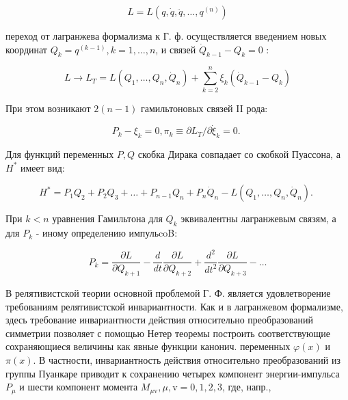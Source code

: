 \documentclass[10pt]{article}
\begin{document}
\[

L=L\left(q, \dot{q}, \ddot{q}, \ldots, q^{(n)}\right)

\]



переход от лагранжева формализма к Г. ф. осуществляется введением новых координат $Q_{k}=q^{(k-1)}, k=1, \ldots, n$, и связей $\dot{Q}_{k-1}-Q_{k}=0$ :



\[

L \rightarrow L_{T}=L\left(Q_{1}, \ldots, Q_{n}, \dot{Q}_{n}\right)+\sum_{k=2}^{n} \xi_{k}\left(\dot{Q}_{k-1}-Q_{k}\right)

\]



При этом возникают $2(n-1)$ гамильтоновых связей II рода:



\[

P_{k}-\xi_{k}=0, \pi_{k} \equiv \partial L_{T} / \partial \dot{\xi}_{k}=0 \text {. }

\]



Для функций переменных $P, Q$ скобка Дирака совпадает со скобкой Пуассона, а $H^{*}$ имеет вид:



\[

H^{*}=P_{1} Q_{2}+P_{2} Q_{3}+\ldots+P_{n-1} Q_{n}+P_{n} \dot{Q}_{n}-L\left(Q_{1}, \ldots, Q_{n}, \dot{Q}_{n}\right) \text {. }

\]



При $k<n$ уравнения Гамильтона для $Q_{k}$ эквивалентны лагранжевым связям, а для $P_{k}$ - иному определению импульcoB:



\[

P_{k}=\frac{\partial L}{\partial Q_{k+1}}-\frac{d}{d t} \frac{\partial L}{\partial Q_{k+2}}+\frac{d^{2}}{d t^{2}} \frac{\partial L}{\partial Q_{k+3}}-\ldots

\]



В релятивистской теории основной проблемой Г. Ф. является удовлетворение требованиям релятивистской инвариантности. Как и в лагранжевом формализме, здесь требование инвариантности действия относительно преобразований симметрии позволяет с помощью Нетер теоремы построить соответствующие сохраняющиеся величины как явные функции канонич. переменных $\varphi(x)$ и $\pi(x)$. В частности, инвариантность действия относительно преобразований из группы Пуанкаре приводит к сохранению четырех компонент энергии-импульса $P_{\mu}$ и шести компонент момента $M_{\mu \mathrm{v}}, \mu, \mathrm{v}=0,1,2,3$, где, напр.,
\end{document}
